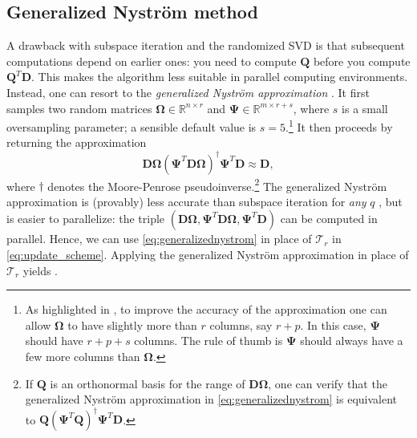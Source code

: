 \documentclass[11pt]{article}
\newcommand{\David}[1]{\textcolor{blue}{\textbf{David:} #1}}
\begin{document}
\subsection{Generalized Nyström method}\label{section:gennystrom}
A drawback with subspace iteration and the randomized SVD is that subsequent computations depend on earlier ones: you need to compute $\bm{Q}$ before you compute $\bm{Q}^T \bm{D}$. This makes the algorithm less suitable in parallel computing environments. Instead, one can resort to the \emph{generalized Nyström approximation} \cite{nakatsukasa2020fast}. It first samples two random matrices $\bm{\Omega} \in \mathbb{R}^{n \times r}$ and $\bm{\Psi} \in \mathbb{R}^{m \times r+s}$, where $s$ is a small oversampling parameter; a sensible default value is $s = 5$.\footnote{As highlighted in , to improve the accuracy of the approximation one can allow $\bm{\Omega}$ to have slightly more than $r$ columns, say $r + p$. In this case, $\bm{\Psi}$ should have $r+p+s$ columns. The rule of thumb is $\bm{\Psi}$ should always have a few more columns than $\bm{\Omega}$.} It then proceeds by returning the approximation
\begin{equation}\label{eq:generalizednystrom}
    \bm{D} \bm{\Omega} \left(\bm{\Psi}^T \bm{D} \bm{\Omega}\right)^{\dagger} \bm{\Psi}^T \bm{D} \approx \bm{D},
\end{equation}
where $\dagger$ denotes the Moore-Penrose pseudoinverse.\footnote{If $\bm{Q}$ is an orthonormal basis for the range of $\bm{D} \bm{\Omega}$, one can verify that the generalized Nyström approximation in \eqref{eq:generalizednystrom} is equivalent to $\bm{Q}(\bm{\Psi}^T \bm{Q})^{\dagger} \bm{\Psi}^T \bm{D}$.} The generalized Nyström approximation is (provably) less accurate than subspace iteration for \emph{any} $q$ \cite[Remark 1]{funnystrom2}, but is easier to parallelize: the triple $(\bm{D}\bm{\Omega}, \bm{\Psi}^T \bm{D} \bm{\Omega}, \bm{\Psi}^T \bm{D})$ can be computed in parallel. Hence, we can use \eqref{eq:generalizednystrom} in place of $\mathcal{T}_r$ in \eqref{eq:update_scheme}. Applying the generalized Nyström approximation in place of $\mathcal{T}_r$ yields .

\end{document}
